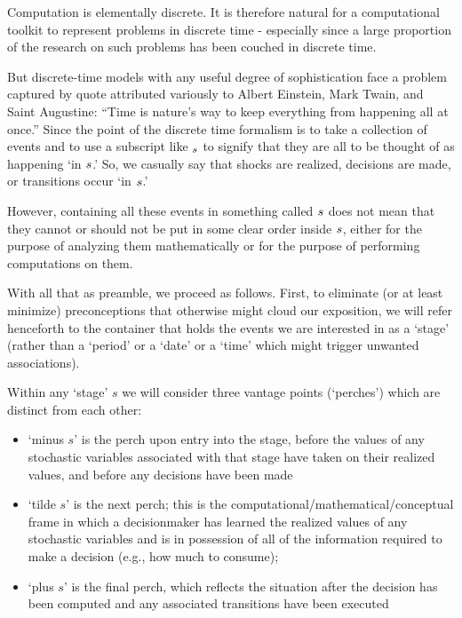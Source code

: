 \documentclass[\econtexRoot/BufferStockTheory]{subfiles}
\begin{document}
Computation is elementally discrete.
It is therefore natural for a computational toolkit to represent problems in discrete time - especially since a large proportion of the research on such problems has been couched in discrete time.

But discrete-time models with any useful degree of sophistication face a problem captured by quote attributed variously to Albert Einstein, Mark Twain, and Saint Augustine: ``Time is nature's way to keep everything from happening all at once.''  Since the point of the discrete time formalism is to take a collection of events and to use a subscript like $_\tnow$ to signify that they are all to be thought of as happening `in $\tnow$.'
So, we casually say that shocks are realized, decisions are made, or transitions occur `in $\tnow$.'

However, containing all these events in something called $\tnow$ does not mean that they cannot or should not be put in some clear order inside $\tnow$, either for the purpose of analyzing them mathematically or for the purpose of performing computations on them.

\newcommand{\stge}{{stage}}
With all that as preamble, we proceed as follows.
First, to eliminate (or at least minimize) preconceptions that otherwise might cloud our exposition, we will refer henceforth to the container that holds the events we are interested in as a `\stge' (rather than a `period' or a `date' or a `time' which might trigger unwanted associations).

\renewcommand{\tnow}{s}
Within any `\stge' $\tnow$ we will consider three vantage points (`perches') which are distinct from each other:
\begin{itemize}
\item[$-~\tnow$] `minus $\tnow$' is the perch upon entry into the {\stge}, before the values of any stochastic variables associated with that {\stge} have taken on their realized values, and before any decisions have been made
\item[$\sim{\tnow}$] `tilde $\tnow$' is the next perch; this is the computational/mathematical/conceptual frame in which a decisionmaker has learned the realized values of any stochastic variables and is in possession of all of the information required to make a decision (e.g., how much to consume);
\item[+~\tnow] `plus $\tnow$' is the final perch, which reflects the situation after the decision has been computed and any associated transitions have been executed
\end{itemize}
\end{document}
